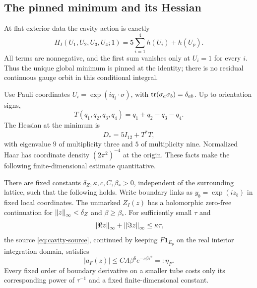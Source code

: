\subsection{The pinned minimum and its Hessian}

At flat exterior data the cavity action is exactly
\begin{equation}\label{eq:pinned-action}
 H_I(U_1,U_2,U_3,U_4;1)=5\sum_{i=1}^{4}h(U_i)+h(U_p).
\end{equation}
All terms are nonnegative, and the first sum vanishes only at $U_i=1$ for every $i$. Thus the unique global minimum is pinned at the identity; there is no residual continuous gauge orbit in this conditional integral.

Use Pauli coordinates $U_i=\exp(iq_i\cdot\sigma)$, with $\operatorname{tr}(\sigma_a\sigma_b)=\delta_{ab}$. Up to orientation signs,
\[
 T(q_1,q_2,q_3,q_4)=q_1+q_2-q_3-q_4.
\]
The Hessian at the minimum is
\begin{equation}\label{eq:pinned-Hessian}
 D_*=5I_{12}+T^*T,
\end{equation}
with eigenvalue $9$ of multiplicity three and $5$ of multiplicity nine. Normalized Haar has coordinate density $(2\pi^2)^{-4}$ at the origin. These facts make the following finite-dimensional estimate quantitative.

\begin{theorem}\label{thm:cavity-tube}
There are fixed constants $\delta_Z,\kappa,c,C,\beta_*>0$, independent of the surrounding lattice, such that the following holds. Write boundary links as $y_b=\exp(iz_b)$ in fixed local coordinates. The unmarked $Z_I(z)$ has a holomorphic zero-free continuation for $\left\lVert z\right\rVert_\infty<\delta_Z$ and $\beta\ge\beta_*$. For sufficiently small $\tau$ and
\[
 \left\lVert \Re z\right\rVert_\infty+\left\lVert \Im z\right\rVert_\infty\le\kappa\tau,
\]
the source \eqref{eq:cavity-source}, continued by keeping $F\mathbf1_{E_p}$ on the real interior integration domain, satisfies
\begin{equation}\label{eq:rare-tube}
 |a_F(z)|\le C A\beta^6e^{-c\beta\tau^2}=:\eta_F.
\end{equation}
Every fixed order of boundary derivative on a smaller tube costs only its corresponding power of $\tau^{-1}$ and a fixed finite-dimensional constant.
\end{theorem}

